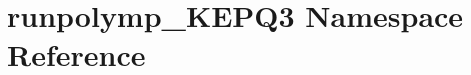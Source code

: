 \hypertarget{namespacerunpolymp__KEPQ3}{\section{runpolymp\-\_\-\-K\-E\-P\-Q3 Namespace Reference}
\label{namespacerunpolymp__KEPQ3}
}
